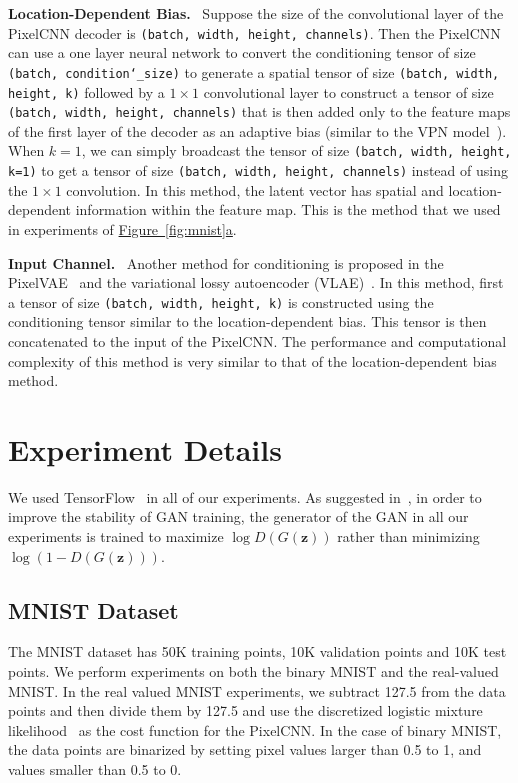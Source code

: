 \documentclass{article}
\newcommand{\myfigg}[2]{\hyperref[fig:#1]{Figure~\ref*{fig:#1}#2}}
\DeclareRobustCommand{\parhead}[1]{\textbf{#1}~}
\begin{document}
\begin{appendices}
\parhead{Location-Dependent Bias.} Suppose the size of the convolutional layer of the PixelCNN decoder is \texttt{(batch, width, height, channels)}. Then the PixelCNN can use a one layer neural network to convert the conditioning tensor of size \texttt{(batch, condition\char`_size)} to generate a spatial tensor of size \texttt{(batch, width, height, k)} followed by a $1 \times 1$ convolutional layer to construct a tensor of size \texttt{(batch, width, height, channels)} that is then added only to the feature maps of the first layer of the decoder as an adaptive bias (similar to the VPN model~\citep{vpn}). When $k=1$, we can simply broadcast the tensor of size \texttt{(batch, width, height, k=1)} to get a tensor of size \texttt{(batch, width, height, channels)} instead of using the $1 \times 1$ convolution. In this method, the latent vector has spatial and location-dependent information within the feature map. This is the method that we used in experiments of \myfigg{mnist}{a}.

\parhead{Input Channel.} Another method for conditioning is proposed in the PixelVAE~\citep{pixelvae} and the variational lossy autoencoder (VLAE)~\citep{vlae}. In this method, first a tensor of size \texttt{(batch, width, height, k)} is constructed using the conditioning tensor similar to the location-dependent bias. This tensor is then concatenated to the input of the PixelCNN. The performance and computational complexity of this method is very similar to that of the location-dependent bias method.



\section{Experiment Details}\label{appendix:experiment}
We used TensorFlow~\citep{tensorflow2015-whitepaper} in all of our experiments. As suggested in~\citep{gan}, in order to improve the stability of GAN training, the generator of the GAN in all our experiments is trained to maximize $\log D(G(\mathbf{z}))$ rather than minimizing $\log(1-D(G(\mathbf{z})))$.
\subsection{MNIST Dataset}\label{appendix:mnist}
The MNIST dataset has 50K training points, 10K validation points and 10K test points. We perform experiments on both the binary MNIST and the real-valued MNIST. In the real valued MNIST experiments, we subtract 127.5 from the data points and then divide them by 127.5 and use the discretized logistic mixture likelihood~\citep{pixelcnn++} as the cost function for the PixelCNN. In the case of binary MNIST, the data points are binarized by setting pixel values larger than 0.5 to 1, and values smaller than 0.5 to 0.


\end{appendices}
\end{document}
